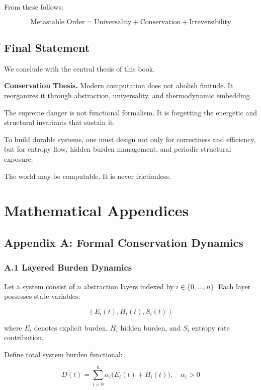 \documentclass[11pt,openany]{book}
\begin{document}
From these follows:

\[
\text{Metastable Order} = \text{Universality} + \text{Conservation} + \text{Irreversibility}
\]

\section{Final Statement}

We conclude with the central thesis of this book.

\medskip

\textbf{Conservation Thesis.}
Modern computation does not abolish finitude.
It reorganizes it through abstraction, universality,
and thermodynamic embedding.

The supreme danger is not functional formalism.
It is forgetting the energetic and structural invariants
that sustain it.

\medskip

To build durable systems,
one must design not only for correctness and efficiency,
but for entropy flow, hidden burden management,
and periodic structural exposure.

\medskip

The world may be computable.
It is never frictionless.

\newpage
\appendix

\chapter{Mathematical Appendices}

\section{Appendix A: Formal Conservation Dynamics}

\subsection{A.1 Layered Burden Dynamics}

Let a system consist of $n$ abstraction layers indexed by $i \in \{0,\dots,n\}$.
Each layer possesses state variables:

\[
(E_i(t), H_i(t), S_i(t))
\]

where $E_i$ denotes explicit burden, $H_i$ hidden burden, and $S_i$ entropy rate contribution.

Define total system burden functional:

\[
D(t) = \sum_{i=0}^{n} \alpha_i \big(E_i(t) + H_i(t)\big),
\quad \alpha_i > 0
\]
\end{document}
